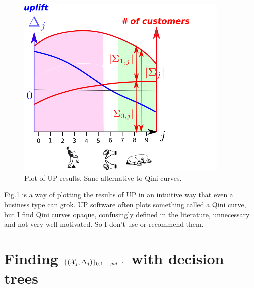 \begin{figure}[h!]
\centering
\includegraphics[width=4in]
{uplift/qini-fake.png}

\caption{
Plot
of UP results.
Sane alternative to Qini curves.
} 
\label{fig-qini-fake}
\end{figure}
Fig.\ref{fig-qini-fake}
is a  way of
plotting
the results 
of UP in an
intuitive
way
that even a
business type can grok.
UP software
often plots something
called a Qini
curve, 
but I find Qini
curves opaque, confusingly defined 
in the literature, unnecessary
and 
not very well motivated. So I don't
use or recommend them.




\section{Finding 
$\{({\cal X}_j, \Delta_j)\}_{0,1, \ldots, nj-1}$ with decision trees}
